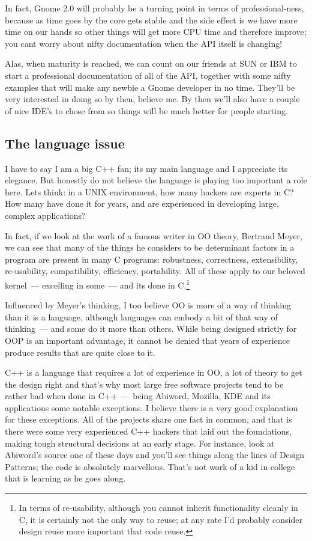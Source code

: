 \documentclass{book}
\begin{document}
In fact, Gnome 2.0 will probably be a turning point in terms of
professional-ness, because as time goes by the core gets stable and
the side effect is we have more time on our hands so other things will
get more CPU time and therefore improve; you cant worry about nifty
documentation when the API itself is changing!

Alas, when maturity is reached, we can count on our friends at SUN or
IBM to start a professional documentation of all of the API, together
with some nifty examples that will make any newbie a Gnome developer
in no time. They'll be very interested in doing so by then, believe
me. By then we'll also have a couple of nice IDE's to chose from so
things will be much better for people starting.

\subsection{The language issue}

I have to say I am a big C++ fan; its my main language and I
appreciate its elegance. But honestly do not believe the language is
playing too important a role here. Lets think: in a UNIX environment,
how many hackers are experts in C? How many have done it for years,
and are experienced in developing large, complex applications?

In fact, if we look at the work of a famous writer in OO theory,
Bertrand Meyer, we can see that many of the things he considers to be
determinant factors in a program are present in many C programs:
robustness, correctness, extensibility, re-usability, compatibility,
efficiency, portability. All of these apply to our beloved kernel~---
excelling in some~--- and its done in C.\footnote{In terms of
  re-usability, although you cannot inherit functionality cleanly in
  C, it is certainly not the only way to reuse; at any rate I'd
  probably consider design reuse more important that code reuse.}

Influenced by Meyer's thinking, I too believe OO is more of a way of
thinking than it is a language, although languages can embody a bit of
that way of thinking~--- and some do it more than others. While being
designed strictly for OOP is an important advantage, it cannot be
denied that years of experience produce results that are quite close
to it.

C++ is a language that requires a lot of experience in OO, a lot of
theory to get the design right and that's why most large free software
projects tend to be rather bad when done in C++~--- being Abiword,
Mozilla, KDE and its applications some notable exceptions. I believe
there is a very good explanation for these exceptions. All of the
projects share one fact in common, and that is there were some very
experienced C++ hackers that laid out the foundations, making tough
structural decisions at an early stage. For instance, look at
Abiword's source one of these days and you'll see things along the
lines of Design Patterns; the code is absolutely marvellous. That's
not work of a kid in college that is learning as he goes along.
\end{document}
